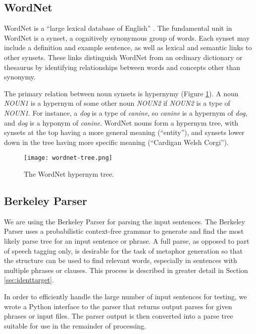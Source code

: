 \documentclass[12pt]{article}
\begin{document}
\subsection{WordNet}

WordNet is a ``large lexical database of English'' \cite{wordnet}. The fundamental unit in WordNet is a synset, a cognitively synonymous group of words. Each synset may include a definition and example sentence, as well as lexical and semantic links to other synsets. These links distinguish WordNet from an ordinary dictionary or thesaurus by identifying relationships between words and concepts other than synonymy.

The primary relation between noun synsets is hypernymy (Figure \ref{fig:wordnettree}). A noun \emph{NOUN1} is a hypernym of some other noun \emph{NOUN2} if \emph{NOUN2} is a type of \emph{NOUN1}. For instance, a \emph{dog} is a type of \emph{canine}, so \emph{canine} is a hypernym of \emph{dog}, and \emph{dog} is a hyponym of \emph{canine}. WordNet nouns form a hypernym tree, with synsets at the top having a more general meaning (``entity''), and synsets lower down in the tree having more specific meaning (``Cardigan Welsh Corgi'').

\begin{figure}[h]
	\centering
	\texttt{[image: wordnet-tree.png]}
	\caption{The WordNet hypernym tree.}
	\label{fig:wordnettree}
\end{figure}

\subsection{Berkeley Parser}
\label{sec:berkeleyparser}

We are using the Berkeley Parser \cite{berkeleyparser} for parsing the input sentences.  The Berkeley Parser uses a probabilistic context-free grammar to generate and find the most likely parse tree for an input sentence or phrase.  A full parse, as opposed to part of speech tagging only, is desirable for the task of metaphor generation so that the structure can be used to find relevant words, especially in sentences with multiple phrases or clauses.  This process is described in greater detail in Section \ref{sec:identtarget}.

In order to efficiently handle the large number of input sentences for testing, we wrote a Python interface to the parser that returns output parses for given phrases or input files.  The parser output is then converted into a parse tree suitable for use in the remainder of processing.
\end{document}
